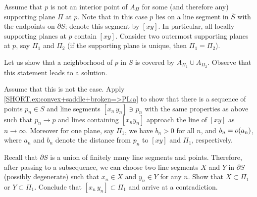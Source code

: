 Assume that $p$ is not an interior point of $A_\Pi$ for some (and therefore any) supporting plane $\Pi$ at $p$.
Note that in this case $p$ lies on a line segment in $\bar S$ with the endpoints on $\partial S$;
denote this segment by $[xy]$.
In particular, all locally supporting planes at $p$ contain $[xy]$.
Consider two outermost supporting planes at $p$, say $\Pi_1$ and $\Pi_2$ (if the supporting plane is unique, then $\Pi_1=\Pi_2$).

Let us show that a neighborhood of $p$ in $S$ is covered by $A_{\Pi_1}\cup A_{\Pi_2}$.
Observe that this statement leads to a solution.

Assume that this is not the case.
Apply \ref{SHORT.ex:convex+saddle+broken=>PL:a} to show that there is a sequence of points $p_n\in S$ and line segments $[x_n\,y_n]\ni p_n$ with the same properties as above such that $p_n\to p$ and lines containing $[x_ny_n]$ approach the line of $[xy]$ as $n\to\infty$.
Moreover for one plane, say $\Pi_1$, we have $b_n>0$ for all $n$, and $b_n\z=o(a_n)$, where $a_n$ and $b_n$ denote the distance from $p_n$ to $[xy]$ and $\Pi_1$, respectively.

Recall that $\partial S$ is a union of finitely many line segments and points.
Therefore, after passing to a subsequence, we can choose two line segments $X$ and $Y$ in $\partial S$ (possibly degenerate) such that $x_n\in X$ and $y_n\in Y$ for any $n$.
Show that $X\subset \Pi_1$ or $Y\subset \Pi_1$.
Conclude that $[x_n\,y_n]\subset \Pi_1$ and arrive at a contradiction.




